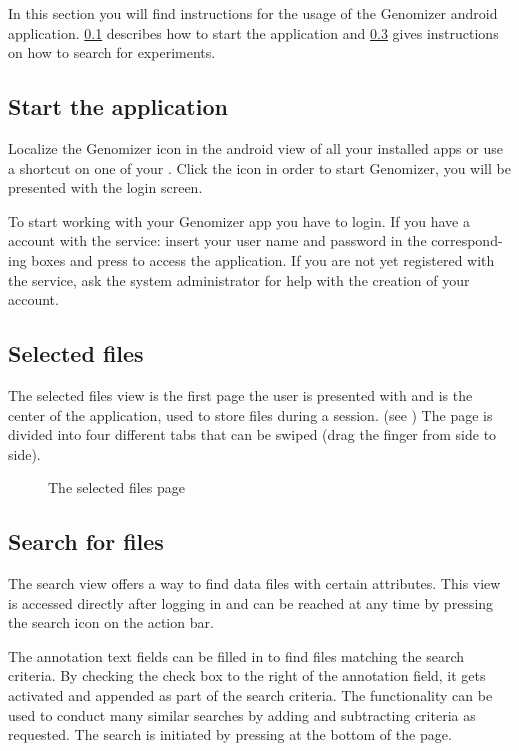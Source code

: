 In this section you will find instructions for the usage of the Genomizer android application. \ref{sec:and_start} describes how to start the application and \ref{sec:and_search} gives instructions on how to search for experiments.
\subsection{Start the application}\label{sec:and_start}
Localize the Genomizer icon in the android view of all your installed apps or
use a shortcut on one of your . Click the icon in order to start
Genomizer, you will be presented with the login screen.

To start working with your Genomizer app you have to login. If you have a
account with the service: insert your user name and password in the correspond-
ing boxes and press  to access the application. If you are not yet
registered with the service, ask the system administrator for help with
the creation of your account.

\subsection{Selected files}
The selected files view is the first page the user is presented with and is the center of the application, used to store files during a session. (see ) The page is divided into four different tabs that can be swiped (drag the finger from side to side).

\begin{figure}
	\caption{The selected files page}
	\label{fig:and_selected}
\end{figure}

\subsection{Search for files}\label{sec:and_search}
The search view offers a way to find data files with certain attributes. This view is accessed directly after logging in and can be reached at any time by pressing the
search icon on the action bar.

The annotation text fields can be filled in to find files matching the search
criteria. By checking the check box to the right of the annotation field, it gets
activated and appended as part of the search criteria. The functionality can
be used to conduct many similar searches by adding and subtracting criteria as
requested. The search is initiated by pressing  at the bottom of the
page.

